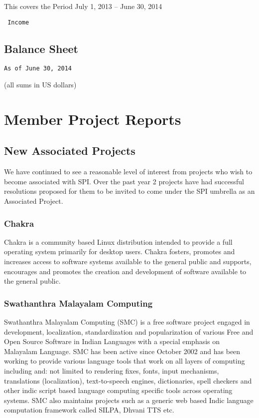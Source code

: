 \documentclass[letterpaper]{report}
\begin{document}
This covers the Period July 1, 2013 -- June 30, 2014

\begin{verbatim}
 Income
\end{verbatim}

\section{Balance Sheet}

\begin{verbatim}
As of June 30, 2014
\end{verbatim}

(all sums in US dollars)


\chapter{Member Project Reports}

\section{New Associated Projects}

We have continued to see a reasonable level of interest from projects who wish
to become associated with SPI. Over the past year 2 projects have had
successful resolutions proposed for them to be invited to come under the SPI
umbrella as an Associated Project.


\subsection{Chakra}

Chakra is a community based Linux distribution intended to provide a full
operating system primarily for desktop users.  Chakra fosters, promotes and
increases access to software systems available to the general public and
supports, encourages and promotes the creation and development of software
available to the general public.


\subsection{Swathanthra Malayalam Computing}

Swathanthra Malayalam Computing (SMC) is a free software project engaged
in development, localization, standardization and popularization of
various Free and Open Source Software in Indian Languages with a special
emphasis on Malayalam Language. SMC has been active since October 2002 and
has been working to provide various language tools that work on all layers
of computing including and: not limited to rendering fixes, fonts, input
mechanisms, translations (localization), text-to-speech engines,
dictionaries, spell checkers and other indic script based language
computing specific tools across operating systems. SMC also maintains
projects such as a generic web based Indic language computation framework
called SILPA, Dhvani TTS etc.
\end{document}
